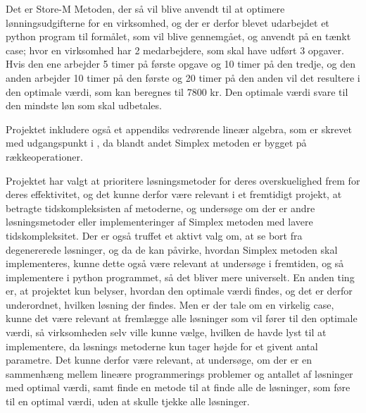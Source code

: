 Det er Store-M Metoden, der så vil blive anvendt til at optimere lønningsudgifterne for en virksomhed, og der er derfor blevet udarbejdet et python program til formålet, som vil blive gennemgået, og anvendt på en tænkt case; hvor en virksomhed har 2 medarbejdere, som skal have udført 3 opgaver. 
Hvis den ene arbejder 5 timer på første opgave og 10 timer på den tredje, og den anden arbejder 10 timer på den første og 20 timer på den anden vil det resultere i den optimale værdi, som kan beregnes til 7800 kr. Den optimale værdi svare til den mindste løn som skal udbetales.

Projektet inkludere også et appendiks vedrørende lineær algebra, som er skrevet med udgangspunkt i \citep{lial}, da blandt andet Simplex metoden er bygget på rækkeoperationer. 


Projektet har valgt at prioritere løsningsmetoder for deres overskuelighed frem for deres effektivitet, og det kunne derfor være relevant i et fremtidigt projekt, at betragte tidskompleksisten af metoderne, og undersøge om der er andre løsningsmetoder eller implementeringer af Simplex metoden med lavere tidskompleksitet.
Der er også truffet et aktivt valg om, at se bort fra degenererede løsninger, og da de kan påvirke, hvordan Simplex metoden skal implementeres, kunne dette også være relevant at undersøge i fremtiden, og så implementere i python programmet, så det bliver mere universelt.
En anden ting er, at projektet kun belyser, hvordan den optimale værdi findes, og det er derfor underordnet, hvilken løsning der findes. 
Men er der tale om en virkelig case, kunne det være relevant at fremlægge alle løsninger som vil fører til den optimale værdi, så virksomheden selv ville kunne vælge, hvilken de havde lyst til at implementere, da løsnings metoderne kun tager højde for et givent antal parametre.
Det kunne derfor være relevant, at undersøge, om der er en sammenhæng mellem lineære programmerings problemer og antallet af løsninger med optimal værdi, samt finde en metode til at finde alle de løsninger, som føre til en optimal værdi, uden at skulle tjekke alle løsninger.